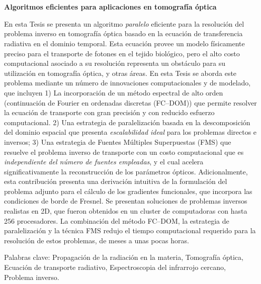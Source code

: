 \pagestyle{empty}
\chapter*{}
\vspace{-3cm}
\begin{center}
\begin{large}
\textbf{Algoritmos eficientes para aplicaciones en tomografía óptica}
\end{large}
\end{center}

\vspace{1cm}
En esta Tesis se presenta un algoritmo {\em paralelo} eficiente  
para la resolución del problema inverso en 
tomografía óptica basado en la ecuación de transferencia radiativa en el dominio temporal. 
Esta ecuación provee un modelo 
físicamente preciso para el transporte de fotones 
en el tejido biológico, pero el alto costo computacional 
asociado a su resolución representa un obstáculo 
para su utilización en tomografía óptica, y otras áreas. En esta Tesis se aborda este problema 
mediante un número de innovaciones computacionales y de 
modelado, que incluyen 1) La incorporación 
de un método espectral de alto orden (continuación de Fourier 
en ordenadas discretas (FC--DOM)) que permite resolver la 
ecuación de transporte con gran precisión y con reducido esfuerzo 
computacional.
2) Una estrategia de paralelización 
basada en la descomposición del dominio espacial que presenta 
\textit{escalabilidad ideal} para los problemas directos 
e inversos; 3) Una estrategia de Fuentes Múltiples Superpuestas 
(FMS) que resuelve el problema inverso de transporte 
con un costo computacional que es {\em independiente del 
número de fuentes empleadas}, y el cual acelera significativamente la reconstrucción de los parámetros ópticos.
Adicionalmente, esta contribución presenta una derivación 
intuitiva de la formulación del problema adjunto para el  
cálculo de los gradientes funcionales, que incorpora 
las condiciones de borde de Fresnel. Se presentan 
soluciones de problemas inversos realistas en 2D, 
que fueron obtenidos en un cluster de computadoras con 
hasta 256 procesadores. La combinación del método 
FC--DOM, la estrategia de paralelización y la técnica 
FMS redujo el tiempo 
computacional requerido para la resolución de estos problemas, 
de meses a unas pocas horas. 

\vspace{1cm}
\noindent
Palabras clave: 
Propagación de la radiación en la materia,
Tomografía óptica,
Ecuación de transporte radiativo, 
Espectroscopia del infrarrojo cercano, 
Problema inverso.
\pagestyle{empty}
